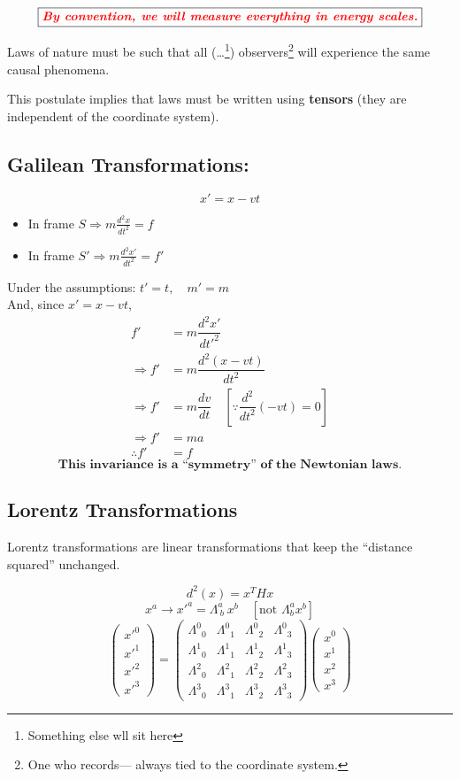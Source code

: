 \documentclass[14pt]{article} %
\begin{document}
$$\fbox{\textcolor{red}{\textbf{\textit{By convention, we will measure everything in energy scales.}}}}$$
\vspace{0.3cm}
\begin{tcolorbox}[ title=Postulate 1 :]
Laws of nature must be such that all (\ldots \footnote{Something else wll sit here}) observers\footnote{One who records--- always tied to the coordinate system.} will experience the same causal phenomena.
\end{tcolorbox}
\noindent
This postulate implies that laws must be written using \textbf{tensors} (they are independent of the coordinate system).
\newpage
\subsection*{Galilean Transformations:}
$$ x' = x - vt $$
\begin{itemize}
    \item In frame $S \Rightarrow m \frac{d^2x}{dt^2} = f$
    \item In frame $S' \Rightarrow m \frac{d^2x'}{dt^2} = f'$
\end{itemize}
Under the assumptions: \quad $t' = t, \quad m' = m$ \\
And, since $x' = x - vt$,
\begin{align*}
    f' &= m \dfrac{d^2 x'}{dt'^2} \\
    \Rightarrow f' &= m \dfrac{d^2 (x - vt)}{dt^2} \\
    \Rightarrow f' &= m \dfrac{dv}{dt} \quad [\because\dfrac{d^2}{dt^2}(-vt) = 0] \\
    \Rightarrow f' &= ma \\
    \therefore f'&= f
\end{align*}
$$ \textbf{This invariance is a ``symmetry'' of the Newtonian laws.} $$
\subsection*{Lorentz Transformations}
Lorentz transformations are linear transformations that keep the ``distance squared'' unchanged.

\[
d^2(x) = x^T H x
\]
\[
x^a \rightarrow x'^a = \Lambda^a_{~b}~x^b \quad [\text{not } \Lambda^a_{b} x^b]
\]
\[
\begin{pmatrix}
x'^0 \\
x'^1 \\
x'^2 \\
x'^3
\end{pmatrix}
=
\begin{pmatrix}
\Lambda^0{}_0 & \Lambda^0{}_1 & \Lambda^0{}_2 & \Lambda^0{}_3 \\
\Lambda^1{}_0 & \Lambda^1{}_1 & \Lambda^1{}_2 & \Lambda^1{}_3 \\
\Lambda^2{}_0 & \Lambda^2{}_1 & \Lambda^2{}_2 & \Lambda^2{}_3 \\
\Lambda^3{}_0 & \Lambda^3{}_1 & \Lambda^3{}_2 & \Lambda^3{}_3
\end{pmatrix}
\begin{pmatrix}
x^0 \\
x^1 \\
x^2 \\
x^3
\end{pmatrix}
\]
\end{document}
